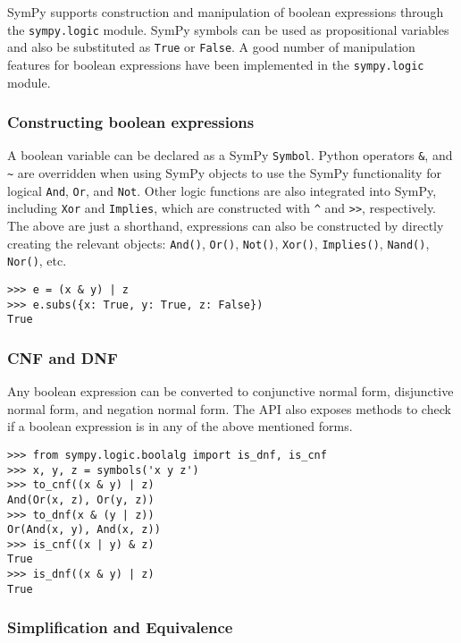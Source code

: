 
SymPy supports construction and manipulation of boolean expressions
through the \texttt{sympy.logic} module. SymPy symbols can be used as
propositional variables and also be substituted as \texttt{True}
or \texttt{False}. A good number of manipulation features for boolean
expressions have been implemented in the \texttt{sympy.logic} module.

\subsubsection{Constructing boolean expressions}

A boolean variable can be declared as a SymPy \verb|Symbol|. Python operators
\texttt{\&}, \texttt{\textbar{}} and \texttt{\textasciitilde{}} are overridden
when using SymPy objects to use the SymPy functionality for logical
\texttt{And}, \texttt{Or}, and \texttt{Not}. Other logic functions are also
integrated into SymPy, including \texttt{Xor} and \texttt{Implies}, which are
constructed with \texttt{\^{}} and \texttt{\textgreater{}\textgreater{}},
respectively. The above are just a shorthand, expressions can also be
constructed by directly creating the relevant objects: \verb|And()|,
\verb|Or()|, \verb|Not()|, \verb|Xor()|, \verb|Implies()|, \verb|Nand()|,
\verb|Nor()|, etc.

\begin{verbatim}
>>> e = (x & y) | z
>>> e.subs({x: True, y: True, z: False})
True
\end{verbatim}

\subsubsection{CNF and DNF}

Any boolean expression can be converted to conjunctive normal form, disjunctive
normal form, and negation normal form. The API also exposes methods to check if
a boolean expression is in any of the above mentioned forms.

\begin{verbatim}
>>> from sympy.logic.boolalg import is_dnf, is_cnf
>>> x, y, z = symbols('x y z')
>>> to_cnf((x & y) | z)
And(Or(x, z), Or(y, z))
>>> to_dnf(x & (y | z))
Or(And(x, y), And(x, z))
>>> is_cnf((x | y) & z)
True
>>> is_dnf((x & y) | z)
True
\end{verbatim}

\subsubsection{Simplification and Equivalence}

